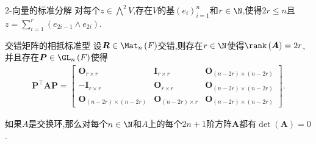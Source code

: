 \begin{corollary}{$2$-向量的标准分解}{}
	对每个$z\in\bigwedge\limits^{2}V$,存在$V$的基$\left(e_{i}\right)_{i=1}^{n}$和$r\in\N$,使得$2r\leq n$且$z=\sum\limits_{i=1}^{r}\left(e_{2i-1}\wedge e_{2i}\right)$.
\end{corollary}

\begin{corollary}{交错矩阵的相抵标准型}{}
	设$\boldsymbol{R}\in\Mat_{n}\left(F\right)$交错,则存在$r\in\N$使得$\rank\left(\boldsymbol{A}\right)=2r$,并且存在$\boldsymbol{P}\in\GL_{n}\left(F\right)$使得
	\begin{align*}
		\boldsymbol{P}^{\top}\boldsymbol{A}\boldsymbol{P}=\begin{bmatrix}
			\boldsymbol{O}_{r\times r}&\boldsymbol{I}_{r\times r}&\boldsymbol{O}_{\left(n-2r\right)\times\left(n-2r\right)}\\
			-\boldsymbol{I}_{r\times r}&\boldsymbol{O}_{r\times r}&\boldsymbol{O}_{\left(n-2r\right)\times\left(n-2r\right)}\\
			\boldsymbol{O}_{\left(n-2r\right)\times\left(n-2r\right)}&\boldsymbol{O}_{\left(n-2r\right)\times r}&\boldsymbol{O}_{\left(n-2r\right)\times\left(n-2r\right)}
		\end{bmatrix}.
	\end{align*}
\end{corollary}

\begin{remark}{}{}
	如果$A$是交换环,那么对每个$n\in\N$和$A$上的每个$2n+1$阶方阵$\boldsymbol{A}$都有$\det\left(\boldsymbol{A}\right)=0$.
\end{remark}
